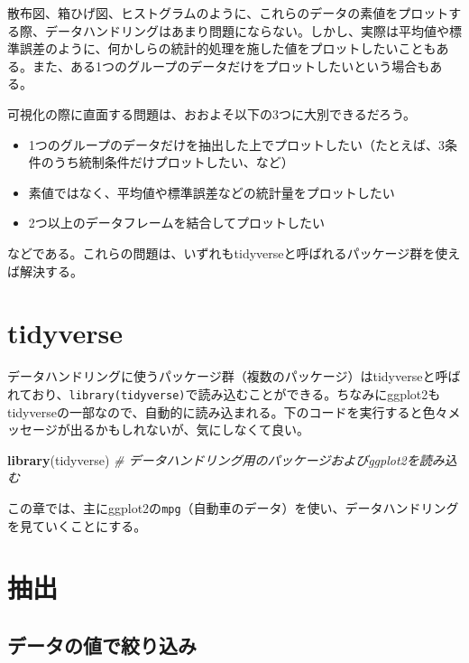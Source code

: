 \documentclass[]{book}
\newenvironment{Shaded}{\begin{snugshade}}{\end{snugshade}}
\newcommand{\KeywordTok}[1]{\textcolor[rgb]{0.13,0.29,0.53}{\textbf{#1}}}
\newcommand{\CommentTok}[1]{\textcolor[rgb]{0.56,0.35,0.01}{\textit{#1}}}
\newcommand{\NormalTok}[1]{#1}
\begin{document}
散布図、箱ひげ図、ヒストグラムのように、これらのデータの素値をプロットする際、データハンドリングはあまり問題にならない。しかし、実際は平均値や標準誤差のように、何かしらの統計的処理を施した値をプロットしたいこともある。また、ある1つのグループのデータだけをプロットしたいという場合もある。

可視化の際に直面する問題は、おおよそ以下の3つに大別できるだろう。

\begin{itemize}
\item
  1つのグループのデータだけを抽出した上でプロットしたい（たとえば、3条件のうち統制条件だけプロットしたい、など）
\item
  素値ではなく、平均値や標準誤差などの統計量をプロットしたい
\item
  2つ以上のデータフレームを結合してプロットしたい
\end{itemize}

などである。これらの問題は、いずれもtidyverseと呼ばれるパッケージ群を使えば解決する。

\section{tidyverse}\label{tidyverse}

データハンドリングに使うパッケージ群（複数のパッケージ）はtidyverseと呼ばれており、\texttt{library(tidyverse)}で読み込むことができる。ちなみにggplot2もtidyverseの一部なので、自動的に読み込まれる。下のコードを実行すると色々メッセージが出るかもしれないが、気にしなくて良い。

\begin{Shaded}
\begin{Highlighting}[]
\KeywordTok{library}\NormalTok{(tidyverse) }\CommentTok{# データハンドリング用のパッケージおよびggplot2を読み込む}
\end{Highlighting}
\end{Shaded}

この章では、主にggplot2の\texttt{mpg}（自動車のデータ）を使い、データハンドリングを見ていくことにする。

\section{抽出}

\subsection{データの値で絞り込み}
\end{document}
